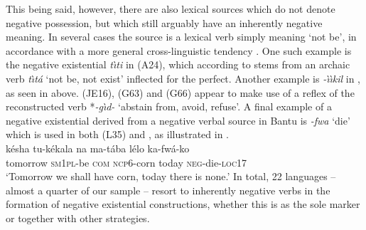 \documentclass[output=paper]{langsci/langscibook}
\begin{document}
This being said, however, there are also lexical sources which do not
denote negative possession, but which still arguably have an inherently
negative meaning. In several cases the source is a lexical verb simply
meaning `not be', in accordance with a more general cross-linguistic
tendency %
%
\parencites(see)(){Veselinova2013b-Bantu}{Veselinova2016}. One such example
is the
negative existential \textit{t{\`\i}ti} in  (A24), which
according to \citet{Ittmann1939,Ittmann1976} stems from an archaic verb
\textit{t{\`\i}t{\'a}} `not be, not exist' inflected for the perfect.
Another example is \textit{-{\`\i}{\`\i}kil} in , as seen in
 above.  (JE16),  (G63) and
 (G66) appear to make use of a reflex of the
reconstructed verb *\textit{-g{\`\i}d-} `abstain from, avoid, refuse'. A
final example of a negative existential derived from a negative verbal
source in Bantu is \textit{-fwa} `die' which is used in both 
(L35) and , as illustrated in .
\ea\label{ex:kaonde-corn} \\ \gll k{\'e}sha tu-k{\'e}kala na ma-t{\'a}ba
l{\'e}lo ka-fw{\'a}-ko\\ tomorrow \textsc{sm1pl}-be \textsc{com}
\textsc{ncp}6-corn today \textsc{neg}-die-\textsc{loc}17\\ \glt `Tomorrow
we shall have corn, today there is none.' \z 
%
In total, 22 languages --
almost a quarter of our sample -- resort to inherently negative verbs in
the formation of negative existential constructions, whether this is as the
sole marker or together with other strategies.
\end{document}
